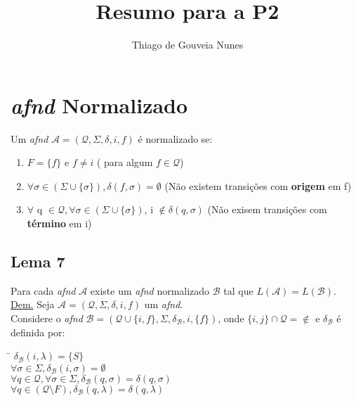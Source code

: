 \documentclass{article}
\title{Resumo para a P2}
\author{Thiago de Gouveia Nunes}
\begin{document}
\maketitle

\newcommand{\afd}{(\mathcal{Q},\Sigma,\delta,i,f)}
\newcommand{\afndn}{(\mathcal{Q} \cup \{i,f\},\Sigma,\delta_\mathcal{B},i,\{f\})}

\section{\emph{afnd} Normalizado}

    Um \emph{afnd} $\mathcal{A} = \afd$ é normalizado se:
    \begin{enumerate}
        \item $ F = \{f\} $ e $ f \neq i $ ( para algum $ f \in \mathcal{Q} $)
        \item $ \forall \sigma \in (\Sigma \cup \{\sigma\}), \delta(f, \sigma) = \emptyset$ 
            (Não existem transições com \textbf{origem} em f)
        \item $ \forall $ q $ \in \mathcal{Q}, \forall \sigma \in (\Sigma \cup \{\sigma\})$, i $\notin \delta(q,\sigma)$
            (Não exisem transições com \textbf{término} em i) 
    \end{enumerate}
    
\subsection{Lema 7}
  Para cada \emph{afnd} $\mathcal{A}$ existe um \emph{afnd} normalizado $\mathcal{B}$ tal que $L(\mathcal{A}) = L(\mathcal{B}).$\\
  \underline{Dem.} Seja $\mathcal{A} = \afd $ um \emph{afnd}. \\
  Considere o \emph{afnd} $\mathcal{B} = \afndn$, onde $ \{i,j\} \cap \mathcal{Q} = \notin$ e $\delta_\mathcal{B}$ é definida por:
  
\begin{tabbing}
    \hspace{1cm}    \= $ \delta_\mathcal{B}(i,\lambda) = \{S\} $ \\[3pt]
                    \> $ \forall \sigma \in \Sigma, \delta_\mathcal{B}(i,\sigma) = \emptyset $ \\ [3pt]
                    \> $ \forall q \in \mathcal{Q}, \forall \sigma \in \Sigma, \delta_\mathcal{B}(q,\sigma) = \delta(q,\sigma) $ \\[3pt]
                    \> $ \forall q \in (\mathcal{Q}\setminus F), \delta_\mathcal{B}(q,\lambda) = \delta(q,\lambda) $ \\[3pt]
                    \> 
                    
\end{tabbing}
\end{document}
